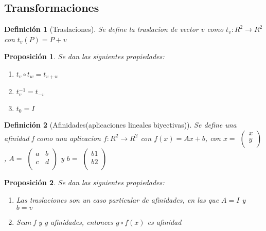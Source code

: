 \documentclass[11pt, a4paper, titlepage]{article}
\theoremstyle{theorem-style}
\newtheorem*{nprop}{Proposición}
\theoremstyle{definition-style}
\newtheorem*{ndef}{Definición}
\theoremstyle{remark-style}
\theoremstyle{example-style}
\newenvironment{nlist}
{\begin{enumerate}
\renewcommand\labelenumi{(\emph{\roman{enumi})}}}
{\end{enumerate}}
\begin{document}
\subsection{Transformaciones}

\begin{ndef}[Traslaciones]
	Se define la traslacion de vector $v$ como $t_v: R^2 \rightarrow R^2$ con $t_v(P) = P + v$
\end{ndef}

\begin{nprop}
	Se dan las siguientes propiedades:
\begin{nlist}
	\item $t_v \circ t_w = t_{v+w}$
	\item $t_{v}^{-1} = t_{-v}$
	\item $t_0 = I$
\end{nlist}
\end{nprop}

\begin{ndef}[Afinidades(aplicaciones lineales biyectivas)]
	Se define una afinidad f como una aplicacion $f:R^2 \rightarrow R^2$ con $f(x) = Ax + b$, con $x =$ $\begin{pmatrix}
	x\\
	y\\
\end{pmatrix}$, $A =$ $\begin{pmatrix}
	a & b\\
	c & d\\
\end{pmatrix}$
y $b =$ $\begin{pmatrix}
	b1\\
	b2\\
\end{pmatrix}$


\end{ndef}

\begin{nprop}
Se dan las siguientes propiedades:
\begin{nlist}
	\item Las traslaciones son un caso particular de afinidades, en las que $A = I$ y $b = v$
	\item Sean f y g afinidades, entonces $g \circ f (x)$ es afinidad
\end{nlist}
\end{nprop}
\end{document}
